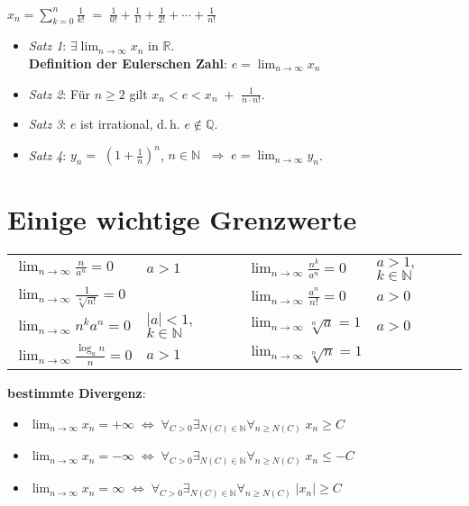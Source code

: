 {\large $x_n = \sum_{k=0}^{n} \frac{1}{k!} \;=\; \frac{1}{0!} + \frac{1}{1!} +
\frac{1}{2!} + \cdots + \frac{1}{n!}$}

\begin{itemize}
    \item \emph{Satz 1}: $\exists \lim_{n \to \infty} x_n$
    in $\mathbb{R}$. \\
    \textbf{Definition der Eulerschen Zahl}: $e = \lim_{n \to \infty} x_n$

    \item \emph{Satz 2}: Für $n \ge 2$ gilt
    $x_n < e < x_n \;+ $ {\large $\frac{1}{n \cdot n!}$}.

    \item \emph{Satz 3}: $e$ ist irrational, d.\,h. $e \notin \mathbb{Q}$.

    \item \emph{Satz 4}: $y_n =$ {\large $(1 + \frac{1}{n})^n$},
    $n \in \mathbb{N}$  $\;\Rightarrow\; e = \lim_{n \to \infty} y_n$.
\end{itemize}

\section{%
    Einige wichtige Grenzwerte%
}

{\large
\begin{tabular}{p{3.8cm}p{3.8cm}p{3.8cm}p{3.8cm}}
    $\lim_{n \to \infty} \frac{n}{a^n} = 0$ & $a > 1$ &
    $\lim_{n \to \infty} \frac{n^k}{a^n} = 0$ & $a > 1,$ $k \in \mathbb{N}$ \\
    $\lim_{n \to \infty} \frac{1}{\sqrt[n]{n!}} = 0$ & &
    $\lim_{n \to \infty} \frac{a^n}{n!} = 0$ & $a > 0$ \\
    $\lim_{n \to \infty} n^k a^n = 0$ & $|a| < 1,$ $k \in \mathbb{N}$ &
    $\lim_{n \to \infty} \sqrt[n]{a} = 1$ & $a > 0$ \\
    $\lim_{n \to \infty} \frac{\log_a{n}}{n} = 0$ & $a > 1$ &
    $\lim_{n \to \infty} \sqrt[n]{n} = 1$
\end{tabular}
}

\vspace{3mm}
\linie

\textbf{bestimmte Divergenz}:

\begin{itemize}
    \item $\lim_{n \to \infty} x_n = +\infty \;\Leftrightarrow\;
    \forall_{C > 0} \exists_{N(C) \in \mathbb{N}} \forall_{n \ge N(C)}\;
    x_n \ge C$

    \item $\lim_{n \to \infty} x_n = -\infty \;\Leftrightarrow\;
    \forall_{C > 0} \exists_{N(C) \in \mathbb{N}} \forall_{n \ge N(C)}\;
    x_n \le -C$

    \item $\lim_{n \to \infty} x_n = \infty \;\Leftrightarrow\;
    \forall_{C > 0} \exists_{N(C) \in \mathbb{N}} \forall_{n \ge N(C)}\;
    |x_n| \ge C$
\end{itemize}


